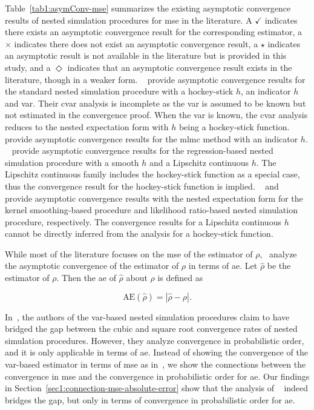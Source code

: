 Table~\ref{tab1:asymConv-mse} summarizes the existing asymptotic convergence results of nested simulation procedures for \gls{mse} in the literature.
A $\checkmark$ indicates there exists an asymptotic convergence result for the corresponding estimator,
a $\times$ indicates there does not exist an asymptotic convergence result, 
a $\star$ indicates an asymptotic result is not available in the literature but is provided in this study, and
a $\Diamond$ indicates that an asymptotic convergence result exists in the literature, though in a weaker form.
~\cite{gordy2010nested} provide asymptotic convergence results for the standard nested simulation procedure with a hockey-stick $h$, an indicator $h$ and \gls{var}.
Their \gls{cvar} analysis is incomplete as the \gls{var} is assumed to be known but not estimated in the convergence proof.
When the \gls{var} is known, the \gls{cvar} analysis reduces to the nested expectation form with $h$ being a hockey-stick function.
~\cite{giles2019multilevel} provide asymptotic convergence results for the \gls{mlmc} method with an indicator $h$.
~\cite{broadie2015risk} provide asymptotic convergence results for the regression-based nested simulation procedure with a smooth $h$ and a Lipschitz continuous $h$.
The Lipschitz continuous family includes the hockey-stick function as a special case, thus the convergence result for the hockey-stick function is implied.
~\cite{hong2017kernel} and~\cite{zhang2022sample} provide asymptotic convergence results with the nested expectation form for the kernel smoothing-based procedure and likelihood ratio-based nested simulation procedure, respectively.
The convergence results for a Lipschitz continuous $h$ cannot be directly inferred from the analysis for a hockey-stick function.

While most of the literature focuses on the \gls{mse} of the estimator of $\rho$,~\cite{wang2022smooth} analyze the asymptotic convergence of the estimator of $\rho$ in terms of \gls{ae}.
Let $\hat{\rho}$ be the estimator of $\rho$. 
Then the \gls{ae} of $\hat{\rho}$ about $\rho$ is defined as

$$
\mbox{AE}\left(\hat{\rho}\right) = \left| \hat{\rho} - \rho \right|.
$$

In~\cite{wang2022smooth}, the authors of the \gls{var}-based nested simulation procedures claim to have bridged the gap between the cubic and square root convergence rates of nested simulation procedures. However, they analyze convergence in probabilistic order, and it is only applicable in terms of \gls{ae}. 
Instead of showing the convergence of the \gls{var}-based estimator in terms of \gls{mse} as in~\cite{gordy2010nested}, we show the connections between the convergence in \gls{mse} and the convergence in probabilistic order for \gls{ae}.
Our findings in Section~\ref{sec1:connection-mse-absolute-error} show that the analysis of ~\cite{wang2022smooth} indeed bridges the gap, but only in terms of convergence in probabilistic order for \gls{ae}.

